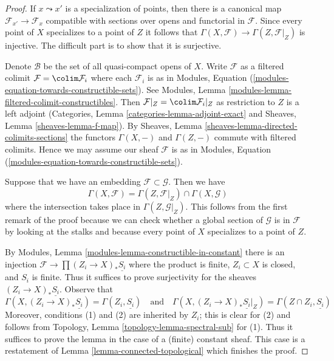 \begin{proof}
If $x \leadsto x'$ is a specialization of points, then there is a
canonical map $\mathcal{F}_{x'} \to \mathcal{F}_x$ compatible with
sections over opens and functorial in $\mathcal{F}$. Since every point
of $X$ specializes to a point of $Z$ it follows that
$\Gamma(X, \mathcal{F}) \to \Gamma(Z, \mathcal{F}|_Z)$ is injective.
The difficult part is to show that it is surjective.

\medskip\noindent
Denote $\mathcal{B}$ be the set of all quasi-compact opens of $X$.
Write $\mathcal{F}$ as a filtered colimit $\mathcal{F} = \colim \mathcal{F}_i$
where each $\mathcal{F}_i$ is as in
Modules, Equation (\ref{modules-equation-towards-constructible-sets}).
See Modules, Lemma \ref{modules-lemma-filtered-colimit-constructibles}.
Then $\mathcal{F}|_Z = \colim \mathcal{F}_i|_Z$ as restriction to $Z$
is a left adjoint (Categories, Lemma \ref{categories-lemma-adjoint-exact} and
Sheaves, Lemma \ref{sheaves-lemma-f-map}).
By Sheaves, Lemma \ref{sheaves-lemma-directed-colimits-sections}
the functors $\Gamma(X, -)$ and $\Gamma(Z, -)$ commute with filtered colimits.
Hence we may assume our sheaf $\mathcal{F}$ is as in
Modules, Equation (\ref{modules-equation-towards-constructible-sets}).

\medskip\noindent
Suppose that we have an embedding $\mathcal{F} \subset \mathcal{G}$.
Then we have
$$
\Gamma(X, \mathcal{F}) =
\Gamma(Z, \mathcal{F}|_Z) \cap \Gamma(X, \mathcal{G})
$$
where the intersection takes place in $\Gamma(Z, \mathcal{G}|_Z)$.
This follows from the first remark of the proof because we can check
whether a global section of $\mathcal{G}$ is in $\mathcal{F}$ by looking
at the stalks and because every point of $X$ specializes to a point of $Z$.

\medskip\noindent
By Modules, Lemma \ref{modules-lemma-constructible-in-constant}
there is an injection $\mathcal{F} \to \prod (Z_i \to X)_*\underline{S_i}$
where the product is finite, $Z_i \subset X$ is closed, and $S_i$ is finite.
Thus it suffices to prove surjectivity for the sheaves
$(Z_i \to X)_*\underline{S_i}$. Observe that
$$
\Gamma(X, (Z_i \to X)_*\underline{S_i}) = \Gamma(Z_i, \underline{S_i})
\quad\text{and}\quad
\Gamma(X, (Z_i \to X)_*\underline{S_i}|_Z) =
\Gamma(Z \cap Z_i, \underline{S_i})
$$
Moreover, conditions (1) and (2) are inherited by $Z_i$; this is clear
for (2) and follows from
Topology, Lemma \ref{topology-lemma-spectral-sub} for (1). Thus it
suffices to prove the lemma in the case of a (finite) constant sheaf.
This case is a restatement of Lemma \ref{lemma-connected-topological}
which finishes the proof.
\end{proof}

